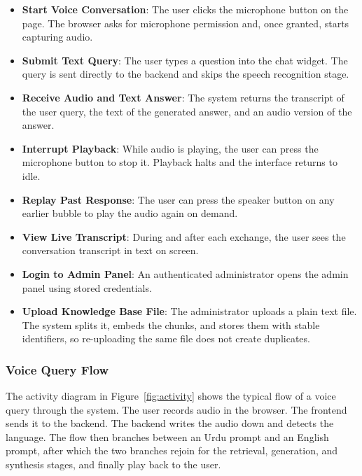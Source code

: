 \documentclass[12pt,a4paper]{report}
\begin{document}
\begin{itemize}
  \item \textbf{Start Voice Conversation}:
        The user clicks the microphone button on the page. The browser
        asks for microphone permission and, once granted, starts
        capturing audio.
  \item \textbf{Submit Text Query}:
        The user types a question into the chat widget. The query is sent
        directly to the backend and skips the speech recognition stage.
  \item \textbf{Receive Audio and Text Answer}:
        The system returns the transcript of the user query, the text of
        the generated answer, and an audio version of the answer.
  \item \textbf{Interrupt Playback}:
        While audio is playing, the user can press the microphone button
        to stop it. Playback halts and the interface returns to idle.
  \item \textbf{Replay Past Response}:
        The user can press the speaker button on any earlier bubble to
        play the audio again on demand.
  \item \textbf{View Live Transcript}:
        During and after each exchange, the user sees the conversation
        transcript in text on screen.
  \item \textbf{Login to Admin Panel}:
        An authenticated administrator opens the admin panel using stored
        credentials.
  \item \textbf{Upload Knowledge Base File}:
        The administrator uploads a plain text file. The system splits
        it, embeds the chunks, and stores them with stable identifiers,
        so re-uploading the same file does not create duplicates.
\end{itemize}

\subsubsection{Voice Query Flow}

The activity diagram in Figure~\ref{fig:activity} shows the typical flow
of a voice query through the system. The user records audio in the
browser. The frontend sends it to the backend. The backend writes the
audio down and detects the language. The flow then branches between an
Urdu prompt and an English prompt, after which the two branches rejoin
for the retrieval, generation, and synthesis stages, and finally play
back to the user.
\end{document}
